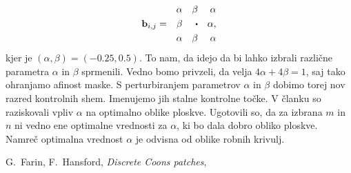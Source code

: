 \documentclass[a4paper,12pt]{article}
\begin{document}
\begin{align*}
   & &\alpha  & &\beta & &\alpha \\
&\mathbf{b}_{i,j}= & \beta & & \sbullet & & \alpha,\\
   & &\alpha & &\beta & &\alpha \\ 
\end{align*}
kjer je $(\alpha, \beta) = (-0.25, 0.5)$. To nam, da idejo da bi lahko izbrali različne 
parametra $\alpha$ in $\beta$ sprmenili. Vedno bomo privzeli, da velja $4\alpha + 4\beta = 1$, saj 
tako ohranjamo afinost maske. S perturbiranjem parametrov 
$\alpha$ in $\beta$ dobimo torej nov razred kontrolnih shem. 
Imenujemo jih stalne kontrolne točke. V članku  so raziskovali
vpliv $\alpha$ na optimalno oblike ploskve. Ugotovili so, da za izbrana $m$ in $n$
ni vedno ene optimalne vrednosti za $\alpha$, ki bo dala dobro obliko ploskve.
Namreč optimalna vrednost $\alpha$ je odvisna od oblike robnih krivulj.

\newpage

\begin{thebibliography}{99}
   G.~Farin, F.~Hansford, \emph{Discrete Coons patches}, 
\end{thebibliography}
\end{document}
